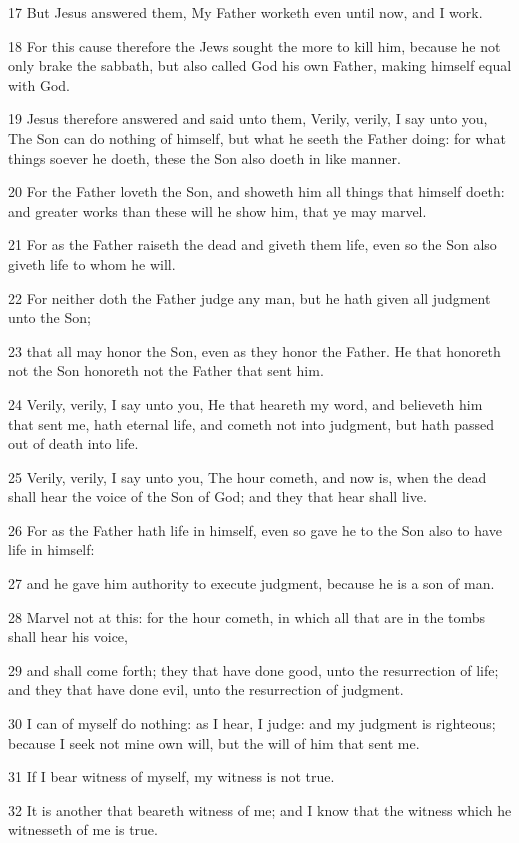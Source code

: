 \par 17 But Jesus answered them, My Father worketh even until now, and I work.
\par 18 For this cause therefore the Jews sought the more to kill him, because he not only brake the sabbath, but also called God his own Father, making himself equal with God.
\par 19 Jesus therefore answered and said unto them, Verily, verily, I say unto you, The Son can do nothing of himself, but what he seeth the Father doing: for what things soever he doeth, these the Son also doeth in like manner.
\par 20 For the Father loveth the Son, and showeth him all things that himself doeth: and greater works than these will he show him, that ye may marvel.
\par 21 For as the Father raiseth the dead and giveth them life, even so the Son also giveth life to whom he will.
\par 22 For neither doth the Father judge any man, but he hath given all judgment unto the Son;
\par 23 that all may honor the Son, even as they honor the Father. He that honoreth not the Son honoreth not the Father that sent him.
\par 24 Verily, verily, I say unto you, He that heareth my word, and believeth him that sent me, hath eternal life, and cometh not into judgment, but hath passed out of death into life.
\par 25 Verily, verily, I say unto you, The hour cometh, and now is, when the dead shall hear the voice of the Son of God; and they that hear shall live.
\par 26 For as the Father hath life in himself, even so gave he to the Son also to have life in himself:
\par 27 and he gave him authority to execute judgment, because he is a son of man.
\par 28 Marvel not at this: for the hour cometh, in which all that are in the tombs shall hear his voice,
\par 29 and shall come forth; they that have done good, unto the resurrection of life; and they that have done evil, unto the resurrection of judgment.
\par 30 I can of myself do nothing: as I hear, I judge: and my judgment is righteous; because I seek not mine own will, but the will of him that sent me.
\par 31 If I bear witness of myself, my witness is not true.
\par 32 It is another that beareth witness of me; and I know that the witness which he witnesseth of me is true.
